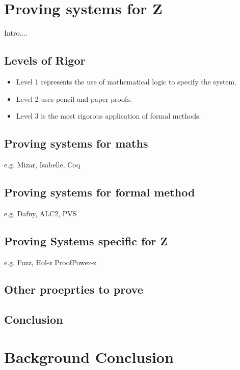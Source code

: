\section{Proving systems for Z}

Intro....

\subsection{Levels of Rigor}

\begin{itemize}
\item Level 1 represents the use of mathematical logic to specify the system.
\item Level 2 uses pencil-and-paper proofs.
\item Level 3 is the most rigorous application of formal methods.

\end{itemize}

\subsection{Proving systems for maths}

e.g. Mizar, Isabelle, Coq

\subsection{Proving systems for formal method}

e.g. Dafny, ALC2, PVS

\subsection{Proving Systems specific for Z}
\label{subsec:provingSystemsForZ}

e.g. Fuzz, Hol-z ProofPower-z

\subsection{Other proeprties to prove}
\label{subsec:propertiestoprove}

\subsection{Conclusion}

\section{Background Conclusion}

